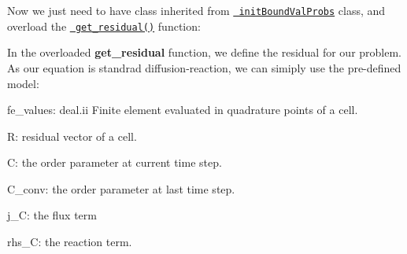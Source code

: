  Now we just need to have class inherited from \href{../html/classinit_bound_val_probs.html}{\texttt{ init\+Bound\+Val\+Probs}} class, and overload the \href{../html/classinit_bound_val_probs.html\#ac8f2c3e2a1040c70b709900dc3dfdaea}{\texttt{ get\+\_\+residual()}} function\+: 
\begin{DoxyCode}{0}
\DoxyCodeLine{\{}
\DoxyCodeLine{    \textcolor{keyword}{public}:}
\DoxyCodeLine{        \textcolor{comment}{//this is a overloaded function }}
\DoxyCodeLine{\};}
\end{DoxyCode}
 In the overloaded {\bfseries{get\+\_\+residual}} function, we define the residual for our problem. As our equation is standrad diffusion-\/reaction, we can simiply use the pre-\/defined model\+: 
\begin{DoxyCode}{0}
\end{DoxyCode}


fe\+\_\+values\+: deal.\+ii Finite element evaluated in quadrature points of a cell.

R\+: residual vector of a cell.

C\+: the order parameter at current time step.

C\+\_\+conv\+: the order parameter at last time step.

j\+\_\+\+C\+: the flux term

rhs\+\_\+\+C\+: the reaction term.





